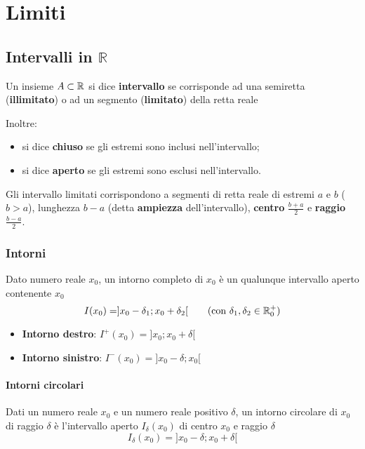 \chapter{Limiti}
\section{Intervalli in $\mathbb{R}$}
\begin{boxdef}
    Un insieme $A \subset \mathbb{R}$ si dice \textbf{intervallo} se corrisponde ad una semiretta (\textbf{illimitato}) o ad un segmento (\textbf{limitato}) della retta reale
\end{boxdef}
Inoltre:
\begin{itemize}
    \item si dice \textbf{chiuso} se gli estremi sono inclusi nell'intervallo;
    \item si dice \textbf{aperto} se gli estremi sono esclusi nell'intervallo.
\end{itemize}
Gli intervallo limitati corrispondono a segmenti di retta reale di estremi $a$ e $b$ ($b>a$), lunghezza $b-a$ (detta \textbf{ampiezza} dell'intervallo), \textbf{centro} $\frac{b+a}{2}$ e \textbf{raggio} $\frac{b-a}{2}$.
\subsection{Intorni}
\begin{boxdef}
    Dato numero reale $x_0$, un intorno completo di $x_0$ è un qualunque intervallo aperto contenente $x_0$ \[I(x_0)=]x_0-\delta_1;x_0+\delta_2[ ~~~~~~ (\text{con }\delta_1, \delta_2 \in \mathbb{R}_0^+ )\]
\end{boxdef}
\begin{itemize}
    \item \textbf{Intorno destro}: $I^+(x_0)=]x_0;x_0+\delta[$
    \item \textbf{Intorno sinistro}: $I^-(x_0)=]x_0-\delta;x_0[$
\end{itemize}
\subsubsection{Intorni circolari}
    \begin{boxdef}
        Dati un numero reale $x_0$ e un numero reale positivo $\delta$, un intorno circolare di $x_0$ di raggio $\delta$ è l'intervallo aperto $I_\delta (x_0)$ di centro $x_0$ e raggio $\delta$ \[I_\delta(x_0)=]x_0-\delta;x_0+\delta[\]
    \end{boxdef}
